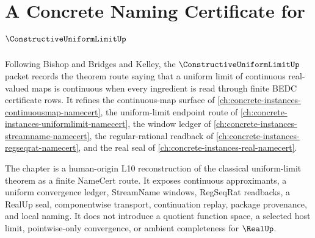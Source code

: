 \chapter{A Concrete Naming Certificate for $\ConstructiveUniformLimitUp$}
\label{ch:concrete-instances-constructive-uniform-limit-namecert}

Following Bishop and Bridges and Kelley, the $\ConstructiveUniformLimitUp$ packet records the theorem route saying that a uniform limit of continuous real-valued maps is continuous when every ingredient is read through finite BEDC certificate rows. It refines the continuous-map surface of \autoref{ch:concrete-instances-continuousmap-namecert}, the uniform-limit endpoint route of \autoref{ch:concrete-instances-uniformlimit-namecert}, the window ledger of \autoref{ch:concrete-instances-streamname-namecert}, the regular-rational readback of \autoref{ch:concrete-instances-regseqrat-namecert}, and the real seal of \autoref{ch:concrete-instances-real-namecert}.

The chapter is a human-origin L10 reconstruction of the classical uniform-limit theorem as a finite NameCert route. It exposes continuous approximants, a uniform convergence ledger, StreamName windows, RegSeqRat readbacks, a RealUp seal, componentwise transport, continuation replay, package provenance, and local naming. It does not introduce a quotient function space, a selected host limit, pointwise-only convergence, or ambient completeness for $\RealUp$.


